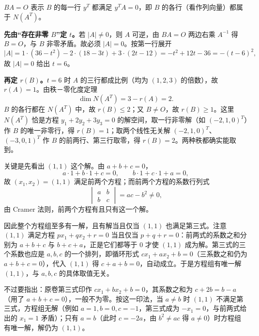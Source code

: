 \begin{solution}
$BA=O$ 表示 $B$ 的每一行 $y^{T}$ 都满足 $y^{T}A=0$，即 $B$ 的各行（看作列向量）都属于 $N(A^{T})$。

\textbf{先由“存在非零 $B$”定 $t$。}若 $|A|\ne0$，则 $A$ 可逆，由 $BA=O$ 两边右乘 $A^{-1}$ 得 $B=O$，与 $B$ 非零矛盾。故必须 $|A|=0$。按第一行展开
\[
|A|=1\cdot(36-t^{2})-2\cdot(18-3t)+3\cdot(2t-12)=-t^{2}+12t-36=-(t-6)^{2},
\]
故 $|A|=0$ 给出 $t=6$。

\textbf{再定 $r(B)$。}$t=6$ 时 $A$ 的三行都成比例（均为 $(1,2,3)$ 的倍数），故 $r(A)=1$。由秩－零化度定理
\[
\dim N(A^{T})=3-r(A)=2 .
\]
$B$ 的各行都在 $N(A^{T})$ 中，故 $r(B)\le2$；又 $B\ne O$，故 $r(B)\ge1$。这里 $N(A^{T})$ 恰是方程 $y_1+2y_2+3y_3=0$ 的解空间，取一行非零解（如 $(-2,1,0)^{T}$）作 $B$ 的唯一非零行，得 $r(B)=1$；取两个线性无关解 $(-2,1,0)^{T}$、$(-3,0,1)^{T}$ 作 $B$ 的前两行、第三行取零，得 $r(B)=2$。两种秩都确实能取到。
\end{solution}

\begin{solution}
关键是先看出 $(1,1)$ 这个解。由 $a+b+c=0$，
\[
a\cdot1+b\cdot1+c=0,\qquad b\cdot1+c\cdot1+a=0,
\]
故 $(x_1,x_2)=(1,1)$ 满足前两个方程；而前两个方程的系数行列式
\[
\begin{vmatrix}a&b\\b&c\end{vmatrix}=ac-b^{2}\ne0,
\]
由 Cramer 法则，前两个方程有且只有这一个解。

因此整个方程组至多有一解，且有解当且仅当 $(1,1)$ 也满足第三式。注意 $(1,1)$ 满足方程 $px_1+qx_2+r=0$ 当且仅当 $p+q+r=0$：前两式的系数之和分别为 $a+b+c$ 与 $b+c+a$，正是它们都等于 $0$ 才使 $(1,1)$ 成为解。第三式的三个系数也应是 $a,b,c$ 的一个排列，即循环形式 $cx_1+ax_2+b=0$（三系数之和仍为 $a+b+c=0$），代入 $(1,1)$ 得 $c+a+b=0$，自动成立。于是方程组有唯一解 $(1,1)$，与 $a,b,c$ 的具体取值无关。

不过要指出：原卷第三式印作 $cx_1+bx_2+b=0$，其系数之和为 $c+2b=b-a$（用了 $a+b+c=0$），一般不为零。按这一印法，当 $a\ne b$ 时 $(1,1)$ 不满足第三式，方程组无解（例如 $a=1,b=0,c=-1$，第三式成为 $-x_1=0$，与前两式给出的 $x_1=1$ 矛盾）；只有 $a=b$（此时 $c=-2a$，由 $b^{2}\ne ac$ 得 $a\ne0$）时方程组有唯一解，解仍为 $(1,1)$。
\end{solution}


